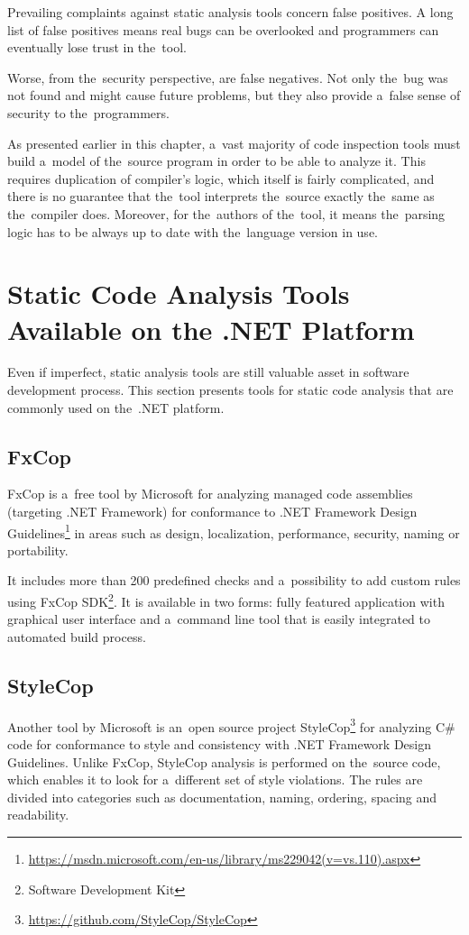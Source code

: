 \documentclass[
  digital, %
  table,   %
  lof,     %
  lot,     %
  oneside,
]{fithesis3}
\begin{document}
Prevailing complaints against static analysis tools concern false positives. A long list of false positives means real bugs can be overlooked and programmers can eventually lose trust in the~tool.

Worse, from the~security perspective, are false negatives. Not only the~bug was not found and might cause future problems, but they also provide a~false sense of security to the~programmers. 

As presented earlier in this chapter, a~vast majority of code inspection tools must build a~model of the~source program in order to be able to analyze it. This requires duplication of compiler's logic, which itself is fairly complicated, and there is no guarantee that the~tool interprets the~source exactly the~same as the~compiler does. Moreover, for the~authors of the~tool, it means the~parsing logic has to be always up to date with the~language version in use. 

\section{Static Code Analysis Tools Available on the .NET Platform}
Even if imperfect, static analysis tools are still valuable asset in software development process. This section presents tools for static code analysis that are commonly used on the~.NET platform.

\subsection{FxCop}
FxCop is a~free tool by Microsoft for analyzing managed code assemblies (targeting .NET Framework) for conformance to .NET Framework Design Guidelines\footnote{\url{https://msdn.microsoft.com/en-us/library/ms229042(v=vs.110).aspx}} in areas such as design, localization, performance, security, naming or portability. 

It includes more than 200 predefined checks and a~possibility to add custom rules using FxCop SDK\footnote{Software Development Kit}. It is available in two forms: fully featured application with graphical user interface and a~command line tool that is easily integrated to automated build process. 

\subsection{StyleCop}
Another tool by Microsoft is an~open source project StyleCop\footnote{\url{https://github.com/StyleCop/StyleCop}} for analyzing C\# code for conformance to style and consistency with .NET Framework Design Guidelines. Unlike FxCop, StyleCop analysis is performed on the~source code, which enables it to look for a~different set of style violations. The rules are divided into categories such as documentation, naming, ordering, spacing and readability. 
\end{document}
